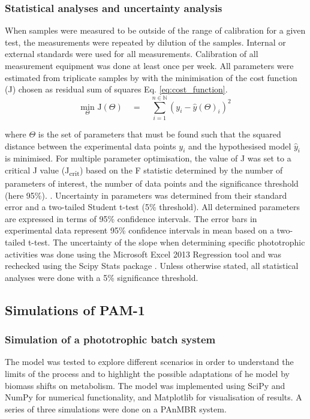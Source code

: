 \subsubsection{Statistical analyses and uncertainty analysis}
When samples were measured to be outside of the range of calibration for a given test, the measurements were repeated by dilution of the samples. Internal or external standards were used for all measurements. Calibration of all measurement equipment was done at least once per week. All parameters were estimated from triplicate samples by with the minimisation of the cost function (J) chosen as residual sum of squares Eq. \eqref{eq:cost_function}.
\begin{equation}
    \label{eq:cost_function}
    \underset{\Theta}{\mathrm{min}}\, \, \mathrm{J}(\Theta)\quad  = \quad \sum_{i = 1}^{n\in\mathbb{N}} \left(y_i - \hat{y}(\Theta)_i    \right)^2
\end{equation}

where $\Theta$ is the set of parameters that must be found such that the squared distance between the experimental data points $y_i$ and the hypothesised model $\hat{y}_i$ is minimised. For multiple parameter optimisation, the value of J was set to a critical J value (J\textsubscript{crit}) based on the F statistic determined by the number of parameters of interest, the number of data points and the significance threshold (here 95\%). \cite{Batstone2003}. Uncertainty in parameters was determined from their standard error and a two-tailed Student t-test (5\% threshold). All determined parameters are expressed in terms of 95\% confidence intervals. The error bars in experimental data represent 95\% confidence intervals in mean based on a two-tailed t-test. The uncertainty of the slope when determining specific phototrophic activities was done using the Microsoft Excel 2013 Regression tool and was rechecked using the Scipy Stats package \cite{Scipy2001}. Unless otherwise stated, all statistical analyses were done with a 5\% significance threshold.

\subsection{Simulations of PAM-1}

\subsubsection{Simulation of a phototrophic batch system}
The model was tested to explore different scenarios in order to understand the limits of the process and to highlight the possible adaptations of he model by biomass shifts on metabolism. The model was implemented using SciPy \cite{SciPy2001} and NumPy \cite{NumPy2011} for numerical functionality, and Matplotlib \cite{Hunter2007a} for visualisation of results. A series of three simulations were done on a PAnMBR system.

